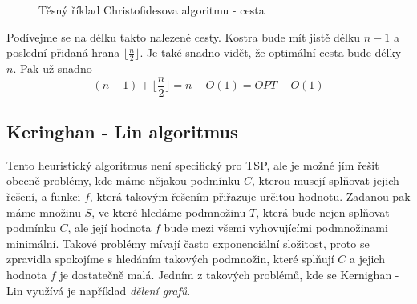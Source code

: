 \documentclass[
  printversion=false,
  joinlists=true,
  glossaries=true,
  figures=true,
  tables=true,
  sourcecodes=false,
  theorems=false,
  bibencoding=utf8,
  language=czech,
  encoding=utf8,
  program=infpvs,
  index=true,
  biblatex=true
]{kidiplom}
\begin{document}
\begin{figure}[H]
        \begin{center}
        \end{center}
    \caption{Těsný říklad Christofidesova algoritmu - cesta}
\end{figure}

Podívejme se na délku takto nalezené cesty. Kostra bude mít jistě délku $n - 1$ a poslední přidaná hrana $\lfloor \frac{n}{2} \rfloor$. Je také snadno vidět, že optimální cesta bude délky $n$. Pak už snadno $$(n - 1) + \lfloor \frac{n}{2} \rfloor = n - O(1) = OPT - O(1)$$

\subsection{Keringhan - Lin algoritmus}

Tento heuristický algoritmus není specifický pro TSP, ale je možné jím řešit obecně problémy, kde máme nějakou podmínku $C$, kterou musejí splňovat jejich řešení, a funkci $f$, která takovým řešením přiřazuje určitou hodnotu. Zadanou pak máme množinu $S$, ve které hledáme podmnožinu $T$, která bude nejen splňovat podmínku $C$, ale její hodnota $f$ bude mezi všemi vyhovujícími podmnožinami minimální. Takové problémy mívají často exponenciální složitost, proto se zpravidla spokojíme s hledáním takových podmnožin, které splňují $C$ a jejich hodnota $f$ je dostatečně malá. Jedním z takových problémů, kde se Kernighan - Lin využívá je například \textit{dělení grafů}. 
\end{document}
